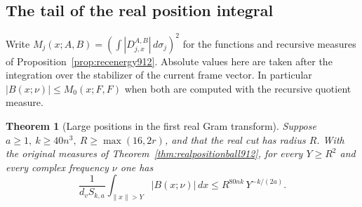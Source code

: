 \documentclass[a4paper,11pt]{article}
\newtheorem{theorem}[proposition]{Theorem}
\theoremstyle{definition}
\theoremstyle{remark}
\numberwithin{equation}{section}
\begin{document}
\subsection{The tail of the real position integral}
\label{sec:realremotetail914}

Write \(M_j(x;A,B)=(\int |D_{j,x}^{A,B}|\,d\sigma_j)^2\)
for the functions and recursive measures of
Proposition~\ref{prop:recenergy912}. Absolute values here are
taken after the integration over the stabilizer of the current
frame vector. In particular \(|B(x;\nu)|\le M_0(x;F,F)\)
when both are computed with the recursive quotient measure.

\begin{theorem}[Large positions in the first real Gram transform]
\leavevmode\label{thm:realremotetail914}
Suppose \(a\ge1,\ k\ge 40n^3,\ R\ge\max(16,2r)\), and that
the real cut has radius \(R\). With the original measures of
Theorem~\ref{thm:realpositionball912}, for every \(Y\ge R^2\)
and every complex frequency \(\nu\) one has
\begin{equation}
  \frac1{d_v S_{k,a}}\int_{\|x\|>Y}|B(x;\nu)|\,dx
       \le R^{80nk}\,Y^{-k/(2a)} .
 \label{eq:realremotetail914}
\end{equation}
\end{theorem}
\end{document}
